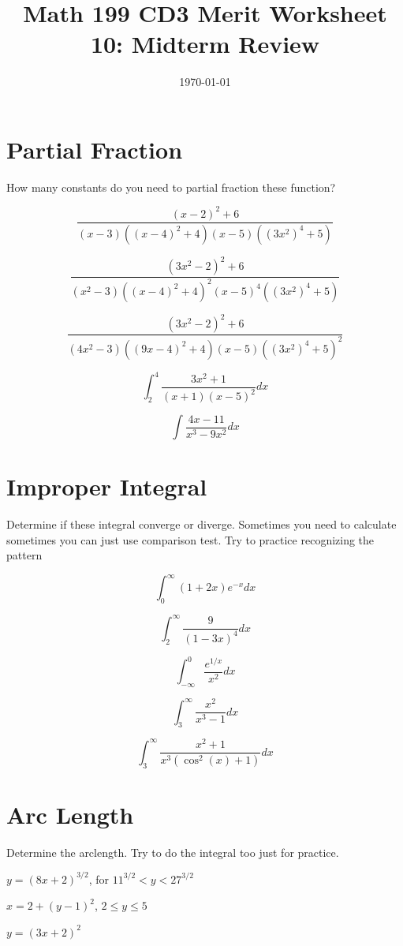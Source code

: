 
\usepackage{fullpage,amsmath,amssymb,amsthm}

\newcommand{\D}{\displaystyle}

\title{Math 199 CD3 Merit Worksheet 10: Midterm Review}
\date{\today}




\maketitle
\section{Partial Fraction}
How many constants do you need to partial fraction these function?
\be
\item $$\frac{(x-2)^2+6}{(x-3)((x-4)^2+4)(x-5)((3x^2)^4+5)}$$
\vfill

\item $$\frac{(3x^2-2)^2+6}{(x^2-3)((x-4)^2+4)^2(x-5)^4((3x^2)^4+5)}$$
\vfill

 
\item $$\frac{(3x^2-2)^2+6}{(4x^2-3)((9x-4)^2+4)(x-5)((3x^2)^4+5)^2}$$
\vfill
\item $$\int_2^4\frac{3x^2+1}{(x+1)(x-5)^2}dx$$
\vfill
\item $$\int\frac{4x-11}{x^3-9x^2}dx$$
\vfill
\newpage

\section{Improper Integral}
Determine if these integral converge or diverge. Sometimes you need to calculate sometimes you can just use comparison test. Try to practice recognizing the pattern
\be
\item $$\int_0^\infty (1+2x)e^{-x}dx$$
\vfill
\item $$\int_2^\infty\frac{9}{(1-3x)^4}dx$$
\vfill
\item $$\int_{-\infty}^0\frac{e^{1/x}}{x^2}dx$$
\vfill
\item $$\int_3^\infty \frac{x^2}{x^3-1}dx$$
\vfill
\item $$\int_3^\infty\frac{x^2+1}{x^3(\cos^2(x)+1)}dx$$
\vfill

\ee
\newpage
\section{Arc Length}
Determine the arclength. Try to do the integral too just for practice.
\be
\item $y=(8x+2)^{3/2}$, for $11^{3/2}<y<27^{3/2}$
\vfill
\item $x=2+(y-1)^2$, $2 \leq y \leq 5$
\vfill
\item $y=(3x+2)^2$ \vfill

